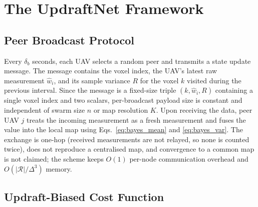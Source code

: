 \documentclass[conference]{IEEEtran}
\newcommand{\rd}[1]{#1}   %
\begin{document}
\section{The UpdraftNet Framework}
\label{sec:framework}

\subsection{Peer Broadcast Protocol}

Every $\delta_b$ seconds, each UAV selects a random peer and
transmits a state update message. The message contains the
voxel index, the \rd{UAV's latest raw measurement $\hat{w}_i$, and its sample variance $R$}
for the voxel $k$ visited during the previous interval. Since
the message is a fixed-size triple \rd{$(k,\hat{w}_i,R)$} containing a
single voxel index and two scalars, per-broadcast payload size
is constant and independent of swarm size $n$ or map resolution
$K$. Upon receiving the data, peer UAV $j$ treats the incoming
\rd{measurement} as a fresh measurement and fuses the value into the
local map using Eqs.~\eqref{eq:bayes_mean} and \eqref{eq:bayes_var}.
\rd{The exchange is one-hop (received measurements are not relayed, so none is counted twice), does not
reproduce a centralised map, and convergence to a common map is not claimed;
the scheme keeps} $O(1)$ per-node communication overhead and $O(|\mathcal{R}|/\rd{\Delta}^3)$
memory.

\subsection{Updraft-Biased Cost Function}
\end{document}
